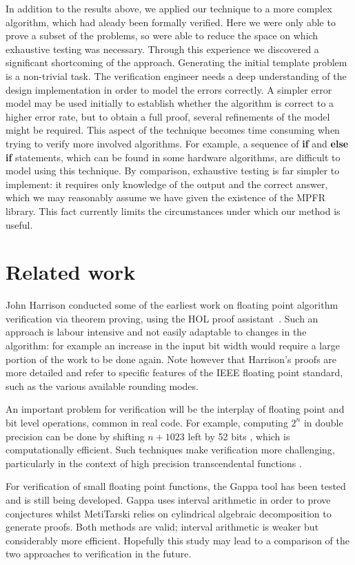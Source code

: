 \documentclass[smallcondensed]{svjour3}
\begin{document}
In addition to the results above, we applied our technique to a more complex algorithm, which had aleady been formally verified. Here we were only able to prove a subset of the problems, so were able to reduce the space on which exhaustive testing was necessary. Through this experience we discovered a significant shortcoming of the approach. Generating the initial template problem is a non-trivial task. The verification engineer needs a deep understanding of the design implementation in order to model the errors correctly. A simpler error model may be used initially to establish whether the algorithm is correct to a higher error rate, but to obtain a full proof, several refinements of the model might be required. This aspect of the technique becomes time consuming when trying to verify more involved algorithms. For example, a sequence of \textbf{if} and \textbf{else if} statements, which can be found in some hardware algorithms, are difficult to model using this technique. By comparison, exhaustive testing is far simpler to implement: it requires only knowledge of the output and the correct answer, which we may reasonably assume we have given the existence of the MPFR library. This fact currently limits the circumstances under which our method is useful. 

\section{Related work}
\label{Related}
John Harrison conducted some of the earliest work on floating point algorithm verification via theorem proving, using the HOL proof assistant~\cite{harrison1997floating}. Such an approach is labour intensive and not easily adaptable to changes in the algorithm: for example an increase in the input bit width would require a large portion of the work to be done again. Note however that Harrison's proofs are more detailed and refer to specific features of the IEEE floating point standard, such as the various available rounding modes. 

An important problem for verification will be the interplay of floating point and bit level operations, common in real code. For example, computing $2^n$ in double precision can be done by shifting $n+1023$ left by 52 bits \cite{mine2012abstract}, which is computationally efficient. Such techniques make verification more challenging, particularly in the context of high precision transcendental functions \cite{lee2016verifying}. 

For verification of small floating point functions, the Gappa tool \cite{de2006assisted,boldo2009combining} has been tested and is still being developed. Gappa uses interval arithmetic in order to prove conjectures whilst MetiTarski relies on cylindrical algebraic decomposition to generate proofs. Both methods are valid; interval arithmetic is weaker but considerably more efficient. Hopefully this study may lead to a comparison of the two approaches to verification in the future.
\end{document}
